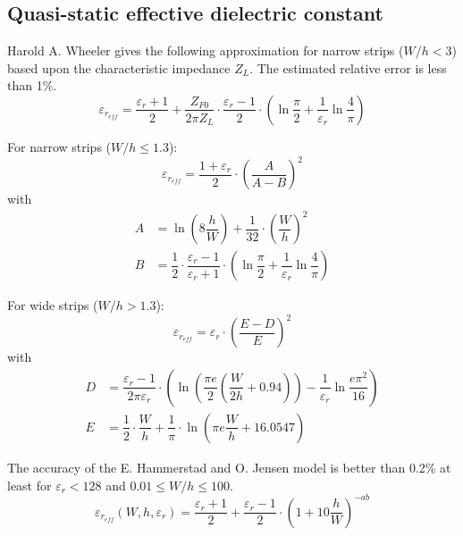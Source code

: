 \documentclass[10pt]{report}
\begin{document}
\subsection{Quasi-static effective dielectric constant}

Harold A. Wheeler \cite{Wheeler} gives the following approximation for
narrow strips ($W/h < 3$) based upon the characteristic impedance
$Z_L$.  The estimated relative error is less than 1\%.
\begin{equation}
\varepsilon_{r_{eff}} = \frac{\varepsilon_{r} + 1}{2} + \frac{Z_{F0}}{2\pi Z_{L}}\cdot \frac{\varepsilon_{r} - 1}{2}\cdot \left(\ln{\frac{\pi}{2}} + \frac{1}{\varepsilon_{r}} \ln{\frac{4}{\pi}}\right)
\end{equation}

For narrow strips ($W/h \le 1.3$):
\begin{equation}
\varepsilon_{r_{eff}} = \dfrac{1 + \varepsilon_r}{2}\cdot \left(\dfrac{A}{A - B}\right)^2
\end{equation}
with
\begin{align}
A &= \ln{\left(8\dfrac{h}{W}\right)} + \dfrac{1}{32}\cdot\left(\dfrac{W}{h}\right)^2\\
B &= \dfrac{1}{2}\cdot \dfrac{\varepsilon_r - 1}{\varepsilon_r + 1} \cdot\left(\ln{\dfrac{\pi}{2}} + \dfrac{1}{\varepsilon_r}\ln{\dfrac{4}{\pi}}\right)
\end{align}

For wide strips ($W/h > 1.3$):
\begin{equation}
\varepsilon_{r_{eff}} = \varepsilon_r\cdot\left(\dfrac{E - D}{E}\right)^2
\end{equation}
with
\begin{align}
D &= \dfrac{\varepsilon_r - 1}{2\pi \varepsilon_r}\cdot\left(\ln{\left(\dfrac{\pi e}{2}\left(\dfrac{W}{2h} + 0.94\right)\right)} - \dfrac{1}{\varepsilon_r} \ln{\dfrac{e\pi^{2}}{16}}\right)\\
E &= \dfrac{1}{2}\cdot\dfrac{W}{h} + \dfrac{1}{\pi}\cdot \ln{\left(\pi e \dfrac{W}{h} + 16.0547\right)}
\end{align}

The accuracy of the E. Hammerstad and O. Jensen \cite{Hammerstad} model
is better than 0.2\% at least for $\varepsilon_r < 128$ and $0.01 \le
W/h \le 100$.
\begin{equation}
\label{eq:HandJErEff}
\varepsilon_{r_{eff}}\left(W, h, \varepsilon_r\right) = \frac{\varepsilon_{r} + 1}{2} + \frac{\varepsilon_{r} - 1}{2}\cdot\left(1 + 10\frac{h}{W}\right)^{-ab}
\end{equation}
\end{document}
